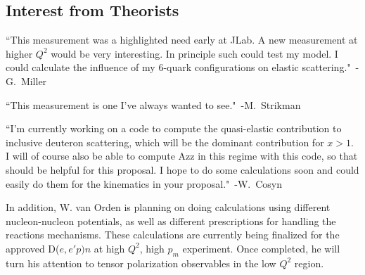 \subsection{Interest from Theorists}

``This measurement was a highlighted need early at JLab. A new measurement at higher $Q^2$ would be very interesting. In principle such could test my model. I could calculate the influence of my 6-quark configurations on elastic scattering."~-G.~Miller

``This measurement is one I've always wanted to see."~-M.~Strikman

``I'm currently working on a code to compute the quasi-elastic  contribution to inclusive deuteron scattering, which will be the dominant contribution for $x > 1$.  I will of course also be able to compute Azz in this regime with this 
code, so that should be helpful for this proposal. I hope to do some 
calculations soon and could easily do them for the kinematics in your 
proposal."~-W.~Cosyn


In addition, W. van Orden is planning on doing calculations using different nucleon-nucleon potentials, as well as different prescriptions for handling the reactions mechanisms.   These calculations are currently being finalized for the approved
D($e,e'p)n$ at high $Q^2$, high $p_m$ experiment. Once completed, he will turn his attention to tensor polarization observables in the low $Q^2$ region.